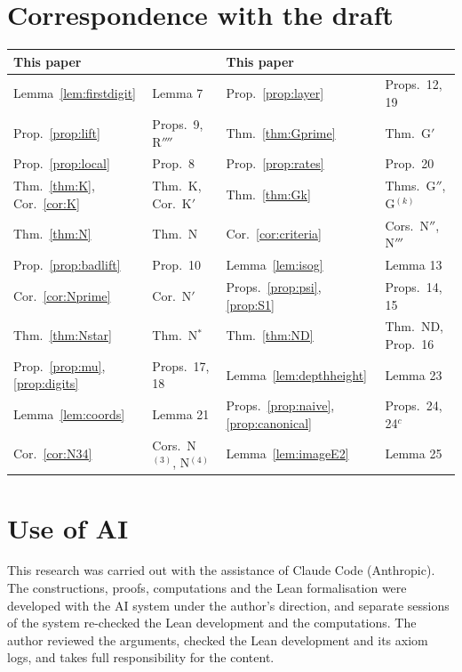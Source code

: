 \documentclass[11pt,a4paper]{amsart}
\theoremstyle{plain}
\theoremstyle{definition}
\theoremstyle{remark}
\begin{document}
\section{Correspondence with the draft}\label{app:labels}

\begin{center}\small
\begin{tabular}{ll|ll}
\toprule
This paper & \cite{Draft} & This paper & \cite{Draft}\\
\midrule
Lemma~\ref{lem:firstdigit} & Lemma 7 & Prop.~\ref{prop:layer} & Props.~12, 19\\
Prop.~\ref{prop:lift} & Props.~9, R$''''$ & Thm.~\ref{thm:Gprime} & Thm.~G$'$\\
Prop.~\ref{prop:local} & Prop.~8 & Prop.~\ref{prop:rates} & Prop.~20\\
Thm.~\ref{thm:K}, Cor.~\ref{cor:K} & Thm.~K, Cor.~K$'$ & Thm.~\ref{thm:Gk} & Thms.~G$''$, G$^{(k)}$\\
Thm.~\ref{thm:N} & Thm.~N & Cor.~\ref{cor:criteria} & Cors.~N$''$, N$'''$\\
Prop.~\ref{prop:badlift} & Prop.~10 & Lemma~\ref{lem:isog} & Lemma 13\\
Cor.~\ref{cor:Nprime} & Cor.~N$'$ & Props.~\ref{prop:psi}, \ref{prop:S1} & Props.~14, 15\\
Thm.~\ref{thm:Nstar} & Thm.~N$^*$ & Thm.~\ref{thm:ND} & Thm.~ND, Prop.~16\\
Prop.~\ref{prop:mu}, \ref{prop:digits} & Props.~17, 18 & Lemma~\ref{lem:depthheight} & Lemma 23\\
Lemma~\ref{lem:coords} & Lemma 21 & Props.~\ref{prop:naive}, \ref{prop:canonical} & Props.~24, 24$^c$\\
Cor.~\ref{cor:N34} & Cors.~N$^{(3)}$, N$^{(4)}$ & Lemma~\ref{lem:imageE2} & Lemma 25\\
\bottomrule
\end{tabular}
\end{center}

\section*{Use of AI}
This research was carried out with the assistance of Claude Code (Anthropic). The constructions, proofs, computations and the Lean formalisation were developed with the AI system under the author's direction, and separate sessions of the system re-checked the Lean development and the computations. The author reviewed the arguments, checked the Lean development and its axiom logs, and takes full responsibility for the content.
\end{document}

